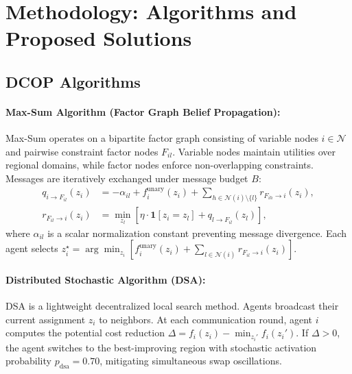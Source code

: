 \documentclass{article}
\newcommand{\ind}{\mathbf{1}}
\newcommand{\N}{\mathcal{N}}
\begin{document}
\section{Methodology: Algorithms and Proposed Solutions}

\subsection{DCOP Algorithms}

\paragraph{Max-Sum Algorithm (Factor Graph Belief Propagation):}
Max-Sum operates on a bipartite factor graph consisting of variable nodes $i \in \N$ and pairwise constraint factor nodes $F_{il}$. Variable nodes maintain utilities over regional domains, while factor nodes enforce non-overlapping constraints. Messages are iteratively exchanged under message budget $B$:
\begin{align}
q_{i \to F_{il}}(z_i) &= -\alpha_{il} + f_i^{\mathrm{unary}}(z_i) + \sum_{h \in \N(i) \setminus \{l\}} r_{F_{ih} \to i}(z_i), \\
r_{F_{il} \to i}(z_i) &= \min_{z_l} \left[ \eta \cdot \ind[z_i = z_l] + q_{l \to F_{il}}(z_l) \right],
\end{align}
where $\alpha_{il}$ is a scalar normalization constant preventing message divergence. Each agent selects $z_i^\star = \arg\min_{z_i} [ f_i^{\mathrm{unary}}(z_i) + \sum_{l \in \N(i)} r_{F_{il} \to i}(z_i) ]$.

\paragraph{Distributed Stochastic Algorithm (DSA):}
DSA is a lightweight decentralized local search method. Agents broadcast their current assignment $z_i$ to neighbors. At each communication round, agent $i$ computes the potential cost reduction $\Delta = f_i(z_i) - \min_{z_i'} f_i(z_i')$. If $\Delta > 0$, the agent switches to the best-improving region with stochastic activation probability $p_{\mathrm{dsa}} = 0.70$, mitigating simultaneous swap oscillations.
\end{document}

